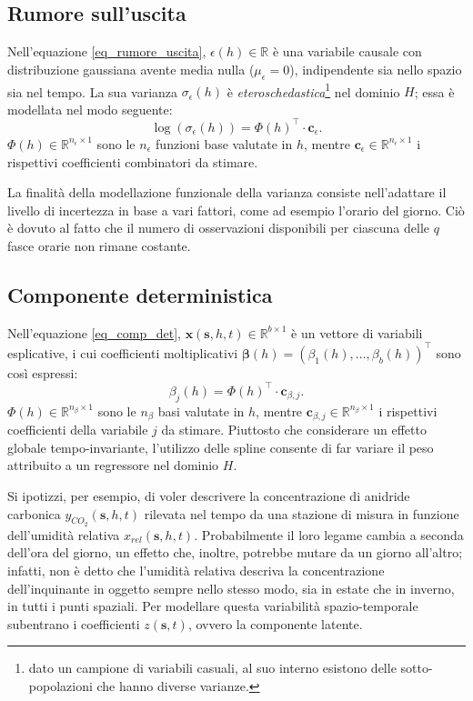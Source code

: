 \subsection[Rumore sull'uscita]{Rumore sull'uscita}
Nell'equazione \ref{eq_rumore_uscita}, $\epsilon (h)\in\mathbb{R}$ è una variabile causale con distribuzione gaussiana avente media nulla ($\mu_\epsilon = 0$), indipendente sia nello spazio sia nel tempo. La sua varianza $\sigma_\epsilon (h)$ è \textit{eteroschedastica}\footnote{dato un campione di variabili casuali, al suo interno esistono delle sotto-popolazioni che hanno diverse varianze.} nel dominio $H$; essa è modellata nel modo seguente:
\begin{equation}
	\log(\sigma_\epsilon(h)) = \Phi(h)^\top\cdot\mathbf{c}_\epsilon.
\end{equation}
$\Phi(h)\in\mathbb{R}^{n_\epsilon\times 1}$ sono le $n_\epsilon$ funzioni base valutate in $h$, mentre $\mathbf{c}_\epsilon\in\mathbb{R}^{n_\epsilon\times 1}$ i rispettivi coefficienti combinatori da stimare. \par La finalità della modellazione funzionale della varianza consiste nell'adattare il livello di incertezza in base a vari fattori, come ad esempio l'orario del giorno. Ciò è dovuto al fatto che il numero di osservazioni disponibili per ciascuna delle $q$ fasce orarie non rimane costante.

\subsection[Componente deterministica]{Componente deterministica}
Nell'equazione \ref{eq_comp_det}, $\mathbf{x}(\mathbf{s}, h, t)\in\mathbb{R}^{b\times 1}$ è un vettore di variabili esplicative, i cui coefficienti moltiplicativi $\boldsymbol{\beta}(h) = (\beta_1(h),\dots,\beta_b(h))^\top$ sono così espressi:
\begin{equation}
	\beta_j(h) = \Phi(h)^\top\cdot\mathbf{c}_{\beta, j}.
\end{equation}
$\Phi(h)\in\mathbb{R}^{n_\beta\times 1}$ sono le $n_\beta$ basi valutate in $h$, mentre $\mathbf{c}_{\beta, j}\in\mathbb{R}^{n_\beta\times 1}$ i rispettivi coefficienti della variabile $j$ da stimare. Piuttosto che considerare un effetto globale tempo-invariante, l'utilizzo delle spline consente di far variare il peso attribuito a un regressore nel dominio $H$. \par Si ipotizzi, per esempio, di voler descrivere la concentrazione di anidride carbonica $y_{CO_2}(\mathbf{s}, h, t)$ rilevata nel tempo da una stazione di misura in funzione dell'umidità relativa $x_{rel}(\mathbf{s}, h, t)$. Probabilmente il loro legame cambia a seconda dell'ora del giorno, un effetto che, inoltre, potrebbe mutare da un giorno all'altro; infatti, non è detto che l'umidità relativa descriva la concentrazione dell'inquinante in oggetto sempre nello stesso modo, sia in estate che in inverno, in tutti i punti spaziali. Per modellare questa variabilità spazio-temporale subentrano i coefficienti $z(\mathbf{s}, t)$, ovvero la componente latente.

